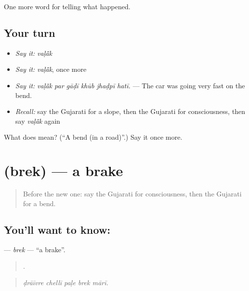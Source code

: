 \begin{grammarlens}[title={What you've built}]
One more word for telling what happened.
\end{grammarlens}

\subsection*{Your turn}
\begin{itemize}
\raggedright
  \item \emph{Say it:} \emph{vaḷā̃k}
  \item \emph{Say it:} \emph{vaḷā̃k}, once more
  \item \emph{Say it:} \emph{vaḷā̃k par gāḍī khūb jhaḍpī hatī.} — The car was going very fast on the bend.
  \item \emph{Recall:} say the Gujarati for a slope, then the Gujarati for consciousness, then say \emph{vaḷā̃k} again
\end{itemize}

\begin{tcolorbox}[breakable,colback=teal!4,colframe=teal!35!black,title={Before you move on}]
What does  mean? (\textquotedblleft{}A bend (in a road)\textquotedblright{}.) Say it once more.
\end{tcolorbox}
\section[\texorpdfstring{\gu{બ્રેક} (brek)}{બ્રેક (brek)}]{ (brek) — a brake}

\label{lesson:GU-C295-brek}



\begin{quote}
Before the new one: say the Gujarati for consciousness, then the Gujarati for a bend.
\end{quote}

\subsection*{You'll want to know: }
\textbf{} — \emph{brek} — \textquotedblleft{}a brake\textquotedblright{}.

\begin{quote}
    .
\end{quote}

\begin{quote}
\emph{ḍrāīvre chellī paḷe brek mārī.}
\end{quote}

